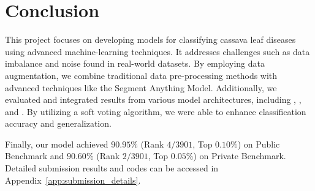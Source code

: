 \section{Conclusion}

This project focuses on developing models for classifying cassava leaf diseases using advanced machine-learning techniques. It addresses challenges such as data imbalance and noise found in real-world datasets. By employing data augmentation, we combine traditional data pre-processing methods with advanced techniques like the Segment Anything Model. Additionally, we evaluated and integrated results from various model architectures, including \VIT, \CONV, and \CROP. By utilizing a soft voting algorithm, we were able to enhance classification accuracy and generalization.

Finally, our model achieved $90.95\%$ (Rank $4 / 3901$, Top $0.10\%$) on Public Benchmark and $90.60\%$ (Rank $2 / 3901$, Top $0.05\%$) on Private Benchmark. Detailed submission results and codes can be accessed in Appendix~\ref{app:submission_details}.